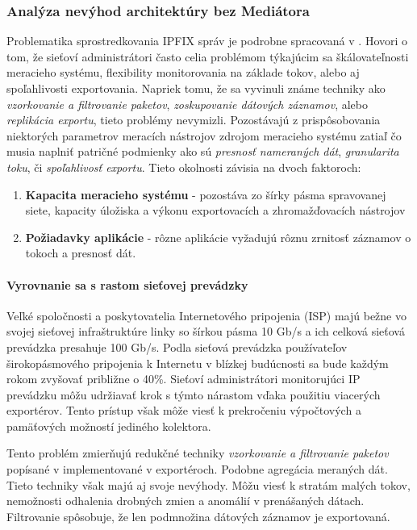 \subsubsection{Anal\'yza nev\'yhod architekt\'ury bez Medi\'atora}


Problematika sprostredkovania IPFIX správ je podrobne spracovaná v \citep{rfc5982}. 
Hovori o tom, že sieťoví administrátori často celia problémom týkajúcim sa škálovateľnosti meracieho 
systému, flexibility monitorovania na základe tokov, alebo aj spoľahlivosti exportovania.
Napriek tomu, že sa vyvinuli známe techniky ako \emph{vzorkovanie a filtrovanie  paketov}, \emph{zoskupovanie 
dátových záznamov}, alebo \emph{replikácia exportu}, tieto problémy nevymizli.
Pozostávajú z prispôsobovania niektorých parametrov meracích nástrojov zdrojom meracieho 
systému zatiaľ čo musia naplniť patričné podmienky ako sú \emph{presnosť nameraných dát}, \emph{granularita 
toku}, či \emph{spoľahlivosť exportu}. Tieto okolnosti závisia na dvoch faktoroch:
\begin{enumerate}
 \item \textbf{Kapacita  meracieho systému} - pozostáva zo šírky pásma  spravovanej siete, kapacity 
 úložiska a výkonu exportovacích a zhromažďovacích nástrojov
 
 \item \textbf{Požiadavky aplikácie} - rôzne aplikácie vyžadujú rôznu zrnitosť záznamov o tokoch a presnosť dát.
\end{enumerate}



\paragraph{Vyrovnanie sa s rastom sieťovej prev\'adzky}

Veľké spoločnosti a poskytovatelia Internetového pripojenia (ISP) majú bežne vo svojej sieťovej 
infraštruktúre linky so šírkou pásma 10 Gb/s a ich celková sieťová prevádzka presahuje 100 Gb/s. 
Podla \citep{trafgrw} sieťová prevádzka používateľov širokopásmového pripojenia k
Internetu v blízkej budúcnosti sa bude každým rokom zvyšovať približne o 40\%. Sieťoví administrátori
monitorujúci IP prevádzku môžu udržiavať krok s týmto nárastom vďaka použitiu viacerých exportérov. 
Tento prístup však môže viesť k prekročeniu výpočtových a pamäťových možností jediného kolektora.

Tento problém zmierňujú redukčné techniky \emph{vzorkovanie a filtrovanie paketov} popísané v \citep{rfc5475}
implementované v exportéroch. Podobne agregácia meraných dát. Tieto techniky však majú aj svoje nevýhody. 
Môžu viesť k stratám malých tokov, nemožnosti odhalenia drobných zmien a anomálií v prenášaných dátach. 
Filtrovanie spôsobuje, že len podmnožina dátových záznamov je exportovaná.

